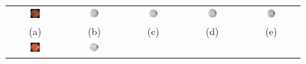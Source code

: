 \documentclass{IEEEtran}
\begin{document}
\begin{figure}[t]
\centering
\begin{tabular}{@{}c c c c c@{}} %
\includegraphics[width=0.18\textwidth]{figs/retina/19_DRIVE_ret} &
\includegraphics[width=0.18\textwidth]{figs/retina/19_DRIVE_segmentation_gabor_inv} &
\includegraphics[width=0.18\textwidth]{figs/retina/19_DRIVE_segmentation_gh2da_inv} &
\includegraphics[width=0.18\textwidth]{figs/retina/19_DRIVE_segmentation_mono_inv} &
\includegraphics[width=0.18\textwidth]{figs/retina/19_DRIVE_segmentation_dt_inv} \\
(a) & (b) & (c) & (d) & (e) \\
\noalign{\smallskip}
%
\includegraphics[width=0.18\textwidth]{figs/retina/08_DRIVE_ret} &
\includegraphics[width=0.18\textwidth]{figs/retina/08_DRIVE_segmentation_gabor_inv} &

\end{tabular}
\end{figure}
\end{document}
